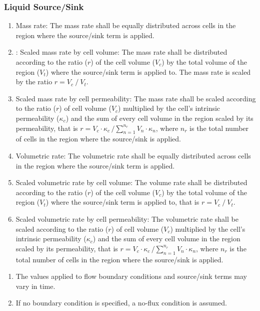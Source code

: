 \subsubsection{Liquid Source/Sink}
\begin{enumerate}[label=FR \arabic*.,ref=FR \arabic*,nosep, resume]
	\item Mass rate: \label{massRate} The mass rate shall be equally distributed across cells in the region where the source/sink term is applied.
	\item: Scaled mass rate by cell volume: \label{scaledMassRateVol} The mass rate shall be distributed according to the ratio ($r$) of the cell volume ($V_c$) by the total volume of the region ($V_t$) where the source/sink term is applied to. The mass rate is scaled by the ratio $r= V_c⁄V_t$.
	\item Scaled mass rate by cell permeability: \label{scaledMassRatePerm} The mass rate shall be scaled according to the ratio ($r$) of cell volume ($V_c$) multiplied by the cell’s intrinsic permeability ($\kappa_c$) and the sum of every cell volume in the region scaled by its permeability, that is $r = V_c \cdot \kappa_c \, / \sum_{n=1}^{n_r} V_n \cdot \kappa_n$, where $n_r$ is the total number of cells in the region where the source/sink is applied.
	\item Volumetric rate: \label{volRate} The volumetric rate shall be equally distributed across cells in the region where the source/sink term is applied.
	\item Scaled volumetric rate by cell volume: \label{scaledVolRateVol} The volume rate shall be distributed according to the ratio ($r$) of the cell volume ($V_c$) by the total volume of the region ($V_t$) where the source/sink term is applied to, that is $r=  V_c ⁄ V_t$.
	\item Scaled volumetric rate by cell permeability: \label{scaledVolRatePerm} The volumetric rate shall be scaled according to the ratio ($r$) of cell volume ($V_c$) multiplied by the cell’s intrinsic permeability ($\kappa_c$) and the sum of every cell volume in the region scaled by its permeability, that is $r = V_c \cdot \kappa_c \, / \sum_{n=1}^{n_r} V_n \cdot \kappa_n$, where $n_r$ is the total number of cells in the region where the source/sink is applied.
\end{enumerate}

\begin{enumerate}[label=FR \arabic*.,ref=FR \arabic*,nosep, resume]
	\item The values applied to flow boundary conditions and source/sink terms may vary in time. 
\label{FRvaryTime}
	\item If no boundary condition is specified, a no-flux condition is assumed. \label{FRnoFlow}
\end{enumerate}

